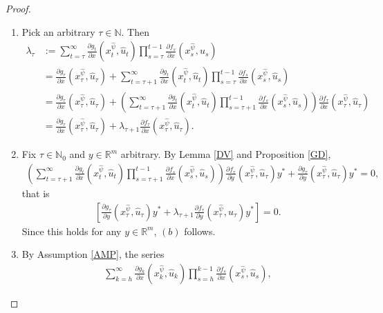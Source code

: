 \documentclass[3p]{elsarticle}
\newcommand{\rzm}{\mathbb R^{m}}
\newcommand{\nat}{\mathbb N_0}
\newcommand{\natu}{\mathbb N}
\begin{document}
	\begin{proof}
		
		\begin{enumerate}
			\item[(a)] Pick an arbitrary $\tau\in\natu$. Then
			\begin{align*}
			\lambda_\tau&:=\sum_{t=\tau}^\infty\frac{\partial g_t}{\partial x}(x_t^{\hat{\psi}},\hat u_t)\prod_{s=\tau}^{t-1}\frac{\partial f_s}{\partial x}(x_s^{\hat{\psi}},\hat u_s)\\
			&=\frac{\partial g_\tau}{\partial x}(x_\tau^{\hat{\psi}},\hat u_\tau)+\sum_{t=\tau+1}^\infty\frac{\partial g_t}{\partial x}(x_t^{\hat{\psi}},\hat u_t)\prod_{s=\tau}^{t-1}\frac{\partial f_s}{\partial x}(x_s^{\hat{\psi}},\hat u_s)\\
			&=\frac{\partial g_\tau}{\partial x}(x_\tau^{\hat{\psi}},\hat u_\tau)+\left( \sum_{t=\tau+1}^\infty\frac{\partial g_t}{\partial x}(x_t^{\hat{\psi}},\hat u_t)\prod_{s=\tau+1}^{t-1}\frac{\partial f_s}{\partial x}(x_s^{\hat{\psi}},\hat u_s)\right)\frac{\partial f_\tau}{\partial x}(x_\tau^{\hat{\psi}},\hat u_\tau)\\
			&=\frac{\partial g_\tau}{\partial x}(x_\tau^{\hat{\psi}},\hat u_\tau)+\lambda_{\tau+1}\frac{\partial f_\tau}{\partial x}(x_\tau^{\hat{\psi}},\hat u_\tau).
			\end{align*}
			\item[(b)] Fix $\tau\in\nat$ and $y\in\rzm$ arbitrary. By Lemma \ref{DV} and Proposition \ref{GD},
			\begin{align*}
			\left( \sum_{t=\tau+1}^\infty\frac{\partial g_t}{\partial x}(x_t^{\hat{\psi}},\hat u_t)\prod_{s=\tau+1}^{t-1}\frac{\partial f_s}{\partial x}(x_s^{\hat{\psi}},\hat u_s)\right)\frac{\partial f_\tau}{\partial y}(x_\tau^{\hat{\psi}},\hat u_\tau)y^*+\frac{\partial g_\tau}{\partial y}(x_\tau^{\hat{\psi}},\hat u_\tau)y^*=0,
			\end{align*}
			that is 
			\begin{align*}
			\left[\frac{\partial g_\tau}{\partial y}(x_\tau^{\hat{\psi}},\hat u_\tau)y^*+\lambda_{\tau+1}\frac{\partial f_\tau}{\partial y}(x_\tau^{\hat{\psi}},\hat u_\tau)y^*\right]=0.
			\end{align*}
			Since this holds for any $y\in\rzm$, $(b)$ follows.
			\item[(c)] By Assumption \ref{AMP}, the series
			\begin{align*}
			\sum_{k=h}^\infty\frac{\partial g_k}{\partial x}(x_k^{\hat{\psi}},\hat u_k)\prod_{s=h}^{k-1}\frac{\partial f_s}{\partial x}(x_s^{\hat{\psi}},\hat u_s),

\end{align*}
\end{enumerate}
\end{proof}
\end{document}
